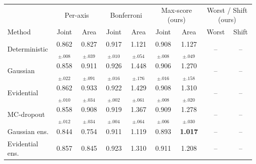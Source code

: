\begin{tabular}{lcccccccc}
\toprule
 & \multicolumn{2}{c}{Per-axis} & \multicolumn{2}{c}{Bonferroni} & \multicolumn{2}{c}{Max-score (ours)} & \multicolumn{2}{c}{Worst / Shift (ours)} \\
Method & Joint & Area & Joint & Area & Joint & Area & Worst & Shift \\
\midrule
Deterministic & 0.862$_{\pm.008}$ & 0.827$_{\pm.039}$ & 0.917$_{\pm.010}$ & 1.121$_{\pm.054}$ & 0.908$_{\pm.008}$ & 1.127$_{\pm.049}$ & -- & -- \\
Gaussian & 0.858$_{\pm.022}$ & 0.911$_{\pm.091}$ & 0.926$_{\pm.016}$ & 1.448$_{\pm.176}$ & 0.906$_{\pm.016}$ & 1.270$_{\pm.158}$ & -- & -- \\
Evidential & 0.862$_{\pm.010}$ & 0.933$_{\pm.034}$ & 0.922$_{\pm.002}$ & 1.429$_{\pm.061}$ & 0.908$_{\pm.008}$ & 1.310$_{\pm.020}$ & -- & -- \\
MC-dropout & 0.858$_{\pm.012}$ & 0.908$_{\pm.034}$ & 0.919$_{\pm.004}$ & 1.367$_{\pm.064}$ & 0.909$_{\pm.006}$ & 1.278$_{\pm.030}$ & -- & -- \\
Gaussian ens. & 0.844 & 0.754 & 0.911 & 1.119 & 0.893 & \textbf{1.017} & -- & -- \\
Evidential ens. & 0.857 & 0.845 & 0.923 & 1.310 & 0.911 & 1.208 & -- & -- \\
\bottomrule
\end{tabular}
